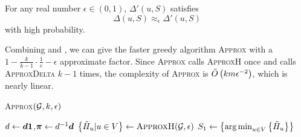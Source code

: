 \documentclass[sigconf]{acmart}
\begin{document}
\begin{lemma}\label{lem:approx-marginest}
  For any real number \(\epsilon\in(0,1)\), \(\Delta'(u,S)\) satisfies
  \[\Delta(u,S)\approx_\epsilon \Delta'(u,S)\]
  with high probability.
\end{lemma}


Combining  and , we can give the faster greedy algorithm \textsc{Approx} with a \(1-\frac{k}{k-1}\cdot\frac{1}{e}-\epsilon\) approximate factor.
Since \textsc{Approx} calls \textsc{ApproxH} once and calls \textsc{ApproxDelta} \(k-1\) times, the complexity of \textsc{Approx} is \(\tilde{O}\left( km\epsilon^{-2} \right)\), which is nearly linear.

\begin{algorithm}
  \caption{\textsc{Approx}\((\mathcal{G},k,\epsilon)\)}
  \label{algo:approx}
  \(d\gets\boldsymbol{d}\boldsymbol{1}\),\(\boldsymbol{\pi}\gets d^{-1}\boldsymbol{d}\)\;
  \(\left\{\tilde{H}_u|u\in V  \right\}\gets\textsc{ApproxH}(\mathcal{G},\epsilon)\)\;
  \(S_1\gets\left\{\operatorname*{arg\,min}_{u\in V}\left\{\tilde{H}_u \right\} \right\}\)\;
\end{algorithm}
\end{document}
